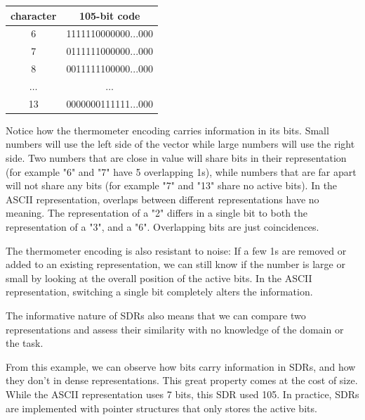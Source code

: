 \documentclass[runningheads]{llncs}
\begin{document}
\begin{center}
\label{tab:sdr}
 \begin{tabular}{||c c||} 
 \hline
 character & 105-bit code \\ [0.5ex] 
 \hline\hline
 6 & 1111110000000...000 \\
 \hline
 7 & 0111111000000...000 \\
 \hline
 8 & 0011111100000...000 \\
 \hline
 $\dots$ & $\dots$\\
 \hline
 13 & 0000000111111...000 \\
 \hline
\end{tabular}
\end{center}

Notice how the thermometer encoding carries information in its bits. Small numbers will use the left side of the vector while large numbers will use the right side. Two numbers that are close in value will share bits in their representation (for example "6" and "7" have 5 overlapping 1s), while numbers that are far apart will not share any bits (for example "7" and "13" share no active bits).
In the ASCII representation, overlaps between different representations have no meaning. The representation of a "2" differs in a single bit to both the representation of a "3", and a "6". Overlapping bits are just coincidences. 

The thermometer encoding is also resistant to noise: If a few 1s are removed or added to an existing representation, we can still know if the number is large or small by looking at the overall position of the active bits. In the ASCII representation, switching a single bit completely alters the information.

The informative nature of SDRs also means that we can compare two representations and assess their similarity with no knowledge of the domain or the task.

From this example, we can observe how bits carry information in SDRs, and how they don't in dense representations.
This great property comes at the cost of size. While the ASCII representation uses 7 bits, this SDR used 105. In practice, SDRs are implemented with pointer structures that only stores the active bits.

\end{document}
